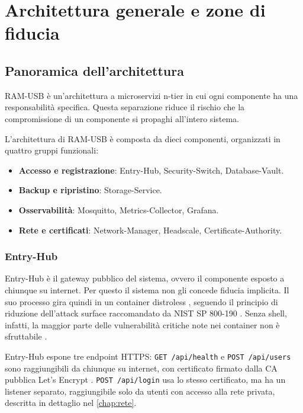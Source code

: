 \chapter{Architettura generale e zone di fiducia}
\label{chap:architettura}

\section{Panoramica dell'architettura}

RAM-USB è un'architettura a microservizi n-tier in cui ogni componente ha una responsabilità specifica. 
Questa separazione riduce il rischio che la compromissione di un componente si propaghi all'intero sistema.

L'architettura di RAM-USB è composta da dieci 
componenti, organizzati in quattro gruppi funzionali: 
\begin{itemize}
    \item \textbf{Accesso e registrazione}: Entry-Hub, Security-Switch, Database-Vault.
    \item \textbf{Backup e ripristino}: Storage-Service.
    \item \textbf{Osservabilità}: Mosquitto, Metrics-Collector, Grafana.
    \item \textbf{Rete e certificati}: Network-Manager, Headscale, Certificate-Authority.
\end{itemize}

\subsection{Entry-Hub}

Entry-Hub è il gateway pubblico del sistema, ovvero il componente esposto a chiunque su internet. Per questo 
il sistema non gli concede fiducia implicita. Il suo processo gira quindi in un container distroless 
\cite{distroless-github}, seguendo il principio di riduzione dell'attack surface raccomandato da 
NIST SP 800-190 \cite{nist-sp-800-190}. 
Senza shell, infatti, la maggior parte delle vulnerabilità critiche note nei container non è sfruttabile 
\cite{wager2024distroless}.

Entry-Hub espone tre endpoint HTTPS: \texttt{GET /api/health} e \texttt{POST /api/users} sono
raggiungibili da chiunque su internet, con certificato firmato dalla CA pubblica Let's Encrypt
\cite{aas2019letsencrypt}. \texttt{POST /api/login} usa lo stesso certificato, ma ha un listener separato,
raggiungibile solo da utenti con accesso alla rete privata, descritta in dettaglio nel
\autoref{chap:rete}.

